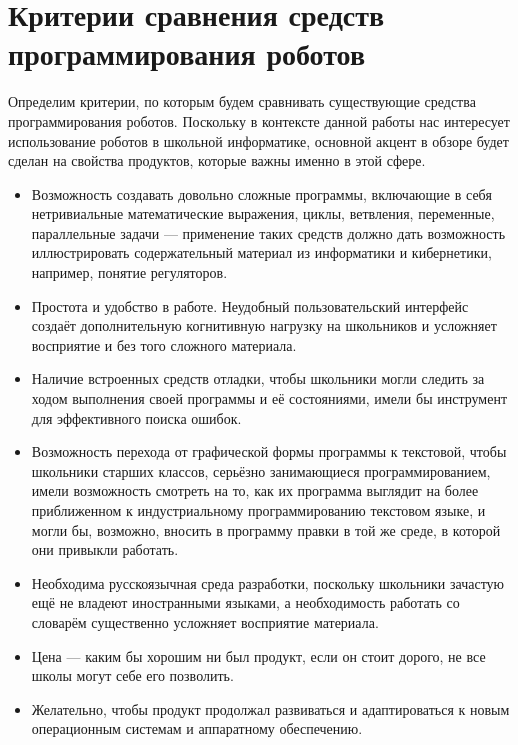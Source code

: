 \documentclass[a4paper]{article}
\begin{document}
\section{Критерии сравнения средств программирования роботов}
Определим критерии, по которым будем сравнивать существующие средства программирования роботов. Поскольку в контексте данной работы нас интересует использование роботов в школьной информатике, основной акцент в обзоре будет сделан на свойства продуктов, которые важны именно в этой сфере.
\begin{itemize}
  \item Возможность создавать довольно сложные программы, включающие в себя нетривиальные математические выражения, циклы, ветвления, переменные, параллельные задачи --- применение таких средств должно дать возможность иллюстрировать содержательный материал из информатики и кибернетики, например, понятие регуляторов.
  \item Простота и удобство в работе. Неудобный пользовательский интерфейс создаёт дополнительную когнитивную нагрузку на школьников и усложняет восприятие и без того сложного материала.
  \item Наличие встроенных средств отладки, чтобы школьники могли следить за ходом выполнения своей программы и её состояниями, имели бы инструмент для эффективного поиска ошибок.
  \item Возможность перехода от графической формы программы к текстовой, чтобы школьники старших классов, серьёзно занимающиеся программированием, имели возможность смотреть на то, как их программа выглядит на более приближенном к индустриальному программированию текстовом языке, и могли бы, возможно, вносить в программу правки в той же среде, в которой они привыкли работать.
  \item Необходима русскоязычная среда разработки, поскольку школьники зачастую ещё не владеют иностранными языками, а необходимость работать со словарём существенно усложняет восприятие материала.
  \item Цена --- каким бы хорошим ни был продукт, если он стоит дорого, не все школы могут себе его позволить.
  \item Желательно, чтобы продукт продолжал развиваться и адаптироваться к новым операционным системам и аппаратному обеспечению.
\end{itemize}
\end{document}
